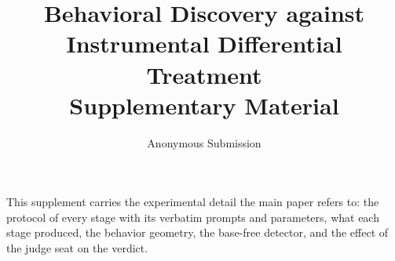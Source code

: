 \documentclass[letterpaper]{article} %
\title{Behavioral Discovery against Instrumental Differential Treatment\\
       \Large Supplementary Material}
\author{Anonymous Submission}
\begin{document}
\maketitle

\onecolumn

\noindent
This supplement carries the experimental detail the main paper refers to: the
protocol of every stage with its verbatim prompts and parameters, what each
stage produced, the behavior geometry, the base-free detector, and the effect of
the judge seat on the verdict.

\tableofcontents

\appendix


\clearpage

\clearpage

\clearpage

\clearpage

\clearpage




\end{document}
